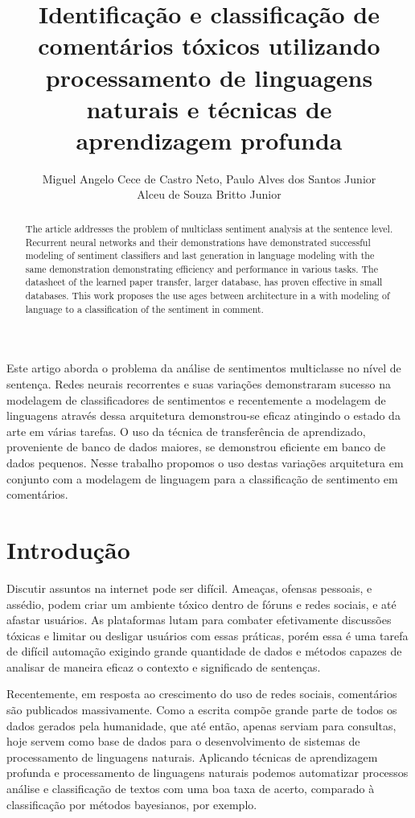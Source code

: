 \documentclass[12pt]{article}
\title{Identificação e classificação de comentários tóxicos utilizando processamento de linguagens naturais e técnicas de aprendizagem profunda}
\author{
    Miguel Angelo Cece de Castro Neto\inst{1},
    Paulo Alves dos Santos Junior\inst{1}\\
    Alceu de Souza Britto Junior\inst{2}
}
\begin{document}
\maketitle

\begin{abstract}
  The article addresses the problem of multiclass sentiment analysis at the sentence level. Recurrent neural networks and their demonstrations have demonstrated successful modeling of sentiment classifiers and last generation in language modeling with the same demonstration demonstrating efficiency and performance in various tasks. The datasheet of the learned paper transfer, larger database, has proven effective in small databases. This work proposes the use ages between architecture in a with modeling of language to a classification of the sentiment in comment.
\end{abstract}

\begin{resumo}
  Este artigo aborda o problema da análise de sentimentos multiclasse no nível de sentença. Redes neurais recorrentes e suas variações demonstraram sucesso na modelagem de classificadores de sentimentos e recentemente a modelagem de linguagens através dessa arquitetura demonstrou-se eficaz atingindo o estado da arte em várias tarefas. O uso da técnica de transferência de aprendizado, proveniente de banco de dados maiores, se demonstrou eficiente em banco de dados pequenos. Nesse trabalho propomos o uso destas variações arquitetura em conjunto com a modelagem de linguagem para a classificação de sentimento em comentários.
\end{resumo}


\section{Introdução} \label{sec:introducao}

Discutir assuntos na internet pode ser difícil. Ameaças, ofensas pessoais, e assédio, podem criar um ambiente tóxico dentro de fóruns e redes sociais, e até afastar usuários. As plataformas lutam para combater efetivamente discussões tóxicas e limitar ou desligar usuários com essas práticas, porém essa é uma tarefa de difícil automação exigindo grande quantidade de dados e métodos capazes de analisar de maneira eficaz o contexto e significado de sentenças.

Recentemente, em resposta ao crescimento do uso de redes sociais, comentários são publicados massivamente. Como a escrita compõe grande parte de todos os dados gerados pela humanidade, que até então, apenas serviam para consultas, hoje servem como base de dados para o desenvolvimento de sistemas de processamento de linguagens naturais. Aplicando técnicas de aprendizagem profunda e processamento de linguagens naturais podemos automatizar processos análise e classificação de textos com uma boa taxa de acerto, comparado à classificação por métodos bayesianos, por exemplo.
\end{document}

